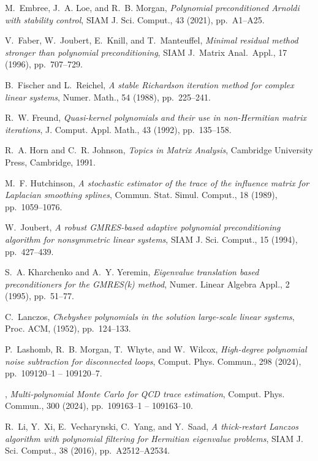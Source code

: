 \documentclass{siamart}
\begin{document}
\begin{thebibliography}{10}
{\sc M.~Embree, J.~A. Loe, and R.~B. Morgan}, {\em Polynomial preconditioned
  {A}rnoldi with stability control}, SIAM J. Sci. Comput., 43 (2021),
  pp.~A1--A25.

{\sc V.~Faber, W.~Joubert, E.~Knill, and T.~Manteuffel}, {\em Minimal residual
  method stronger than polynomial preconditioning}, SIAM J.~Matrix Anal.\
  Appl., 17 (1996), pp.~707--729.

{\sc B.~Fischer and L.~Reichel}, {\em A stable {R}ichardson iteration method
  for complex linear systems}, Numer. Math., 54 (1988), pp.~225--241.

{\sc R.~W. Freund}, {\em Quasi-kernel polynomials and their use in
  non-{H}ermitian matrix iterations}, J. Comput. Appl. Math., 43 (1992),
  pp.~135--158.

{\sc R.~A. Horn and C.~R. Johnson}, {\em Topics in Matrix Analysis}, Cambridge
  University Press, Cambridge, 1991.

{\sc M.~F. Hutchinson}, {\em A stochastic estimator of the trace of the
  influence matrix for {L}aplacian smoothing splines}, Commun. Stat. Simul.
  Comput., 18 (1989), pp.~1059--1076.

{\sc W.~Joubert}, {\em A robust {GMRES}-based adaptive polynomial
  preconditioning algorithm for nonsymmetric linear systems}, SIAM J. Sci.
  Comput., 15 (1994), pp.~427--439.

{\sc S.~A. Kharchenko and A.~Y. Yeremin}, {\em Eigenvalue translation based
  preconditioners for the {GMRES}(k) method}, Numer. Linear Algebra Appl., 2
  (1995), pp.~51--77.

{\sc C.~Lanczos}, {\em Chebyshev polynomials in the solution large-scale linear
  systems}, Proc. ACM,  (1952), pp.~124--133.

{\sc P.~Lashomb, R.~B. Morgan, T.~Whyte, and W.~Wilcox}, {\em High-degree
  polynomial noise subtraction for disconnected loops}, Comput. Phys. Commun.,
  298 (2024), pp.~109120--1 -- 109120--7.

\leavevmode\vrule height 2pt depth -1.6pt width 23pt, {\em Multi-polynomial
  {M}onte {C}arlo for {QCD} trace estimation}, Comput. Phys. Commun., 300
  (2024), pp.~109163--1 -- 109163--10.

{\sc R.~Li, Y.~Xi, E.~Vecharynski, C.~Yang, and Y.~Saad}, {\em A thick-restart
  {L}anczos algorithm with polynomial filtering for {H}ermitian eigenvalue
  problems}, SIAM J. Sci. Comput., 38 (2016), pp.~A2512--A2534.


\end{thebibliography}
\end{document}
